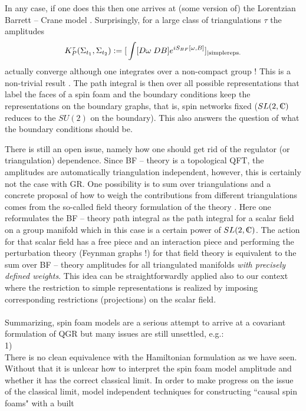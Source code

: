 \documentclass[12pt]{report}
\def\be{\begin{equation}}
\def\ee{\end{equation}}
\def\Cl{{\mathchoice
{\setbox0=\hbox{$\displaystyle\rm C$}\hbox{\hbox to0pt
{\kern0.4\wd0\vrule height0.9\ht0\hss}\box0}}
{\setbox0=\hbox{$\textstyle\rm C$}\hbox{\hbox to0pt
{\kern0.4\wd0\vrule height0.9\ht0\hss}\box0}}
{\setbox0=\hbox{$\scriptstyle\rm C$}\hbox{\hbox to0pt
{\kern0.4\wd0\vrule height0.9\ht0\hss}\box0}}
{\setbox0=\hbox{$\scriptscriptstyle\rm C$}\hbox{\hbox to0pt
{\kern0.4\wd0\vrule height0.9\ht0\hss}\box0}}}}
\begin{document}
In any case, if one does this then one arrives at (some version of) the
Lorentzian Barrett -- Crane model \cite{52}. Surprisingly, for a large 
class of triangulations $\tau$ the amplitudes 
\be \label{3.3.11}
K^\tau_P(\Sigma_{t_1},\Sigma_{t_2}):=
{[}\int [D\omega\;DB] e^{iS_{BF}[\omega,B]}]_{|{\rm simple reps.}}
\ee
actually converge although one integrates over a non-compact group !
This is a non-trivial result \cite{53}. The path integral is then over 
all possible representations that label the faces of a spin foam 
and the boundary conditions keep the representations on the boundary 
graphs, that is, spin networks fixed ($SL(2,\Cl)$ reduces to the $SU(2)$
on the boundary). This also answers the question of 
what the boundary conditions should be.  
 
There is still an open issue, namely how one should get rid of the 
regulator (or triangulation) dependence. Since BF -- theory is a 
topological QFT, the amplitudes are automatically triangulation 
independent, however, this is certainly not the case with GR. One 
possibility is to sum over triangulations and a concrete proposal of how 
to weigh the contributions from different triangulations comes from the 
so-called field theory formulation of the theory \cite{54}. Here 
one reformulates the BF -- theory path integral as the path integral for a 
scalar field on a group manifold which in this case is a certain power of 
$SL(2,\Cl)$. The action for that scalar field has a free piece and an 
interaction piece and performing the perturbation theory (Feynman graphs 
!) for that field theory is equivalent to the sum over BF -- theory 
amplitudes for all triangulated manifolds {\it with precisely defined 
weights}. This idea can be 
straightforwardly applied also to our context where the restriction
to simple representations is realized by imposing corresponding 
restrictions (projections) on the scalar field. \\
\\
Summarizing, spin foam models are a serious attempt to 
arrive at a covariant formulation of QGR but many issues are still 
unsettled, e.g.:\\
1)\\
There is no clean equivalence with the Hamiltonian formulation as we 
have seen. Without that it is unlcear how to interpret the spin foam
model amplitude and whether it has the correct classical limit. In order
to make progress on the issue of the classical limit, model independent
techniques for constructing ``causal spin foams" \cite{54a} with a built
\end{document}
